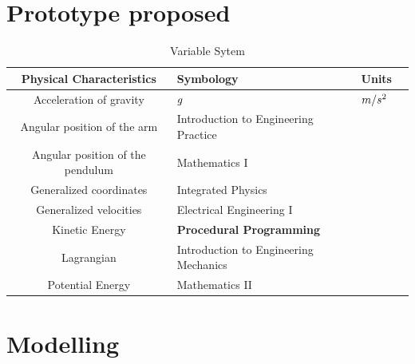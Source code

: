 \documentclass{UoNMCHA}
\numberwithin{equation}{section}
\begin{document}
\section{Prototype proposed}
\begin{table}[h!]
	\begin{center}\label{tab:Variable System}
		\caption{Variable Sytem}\label{tab:notation}
		{\footnotesize
			\begin{tabular}{c l l l|}
				\hline
				Physical Characteristics & {Symbology} & {Units} \\ \hline 
				 Acceleration of gravity & {$\boldmath{g}$} & $\boldmath{m/s^2}$ \\
				 Angular position of the arm & Introduction to Engineering Practice\\
				 Angular position of the pendulum & Mathematics I\\
				 Generalized coordinates & Integrated Physics\\
				 Generalized velocities & Electrical Engineering I\\
				 Kinetic Energy & \textbf{Procedural Programming}  \\
				 Lagrangian & Introduction to Engineering Mechanics\\
				 Potential Energy & Mathematics II 
				\\ \hline
	
			\end{tabular}
		}
	\end{center}
\end{table}
\newpage
\section{Modelling}\label{sec:Core Section}
\end{document}
